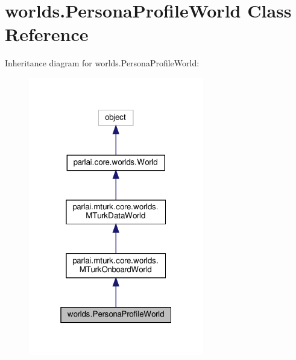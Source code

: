\hypertarget{classworlds_1_1PersonaProfileWorld}{}\section{worlds.\+Persona\+Profile\+World Class Reference}
\label{classworlds_1_1PersonaProfileWorld}


Inheritance diagram for worlds.\+Persona\+Profile\+World\+:
\nopagebreak
\begin{figure}[H]
\begin{center}
\leavevmode
\includegraphics[width=217pt]{classworlds_1_1PersonaProfileWorld__inherit__graph}
\end{center}
\end{figure}


